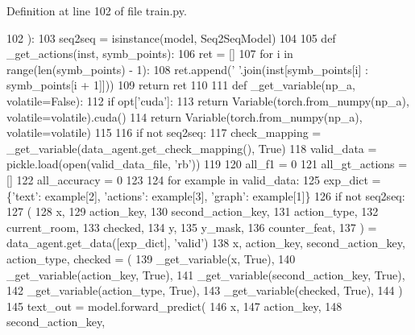 Definition at line 102 of file train.\+py.


\begin{DoxyCode}
102 ):
103     seq2seq = isinstance(model, Seq2SeqModel)
104 
105     \textcolor{keyword}{def }\_get\_actions(inst, symb\_points):
106         ret = []
107         \textcolor{keywordflow}{for} i \textcolor{keywordflow}{in} range(len(symb\_points) - 1):
108             ret.append(\textcolor{stringliteral}{' '}.join(inst[symb\_points[i] : symb\_points[i + 1]]))
109         \textcolor{keywordflow}{return} ret
110 
111     \textcolor{keyword}{def }\_get\_variable(np\_a, volatile=False):
112         \textcolor{keywordflow}{if} opt[\textcolor{stringliteral}{'cuda'}]:
113             \textcolor{keywordflow}{return} Variable(torch.from\_numpy(np\_a), volatile=volatile).cuda()
114         \textcolor{keywordflow}{return} Variable(torch.from\_numpy(np\_a), volatile=volatile)
115 
116     \textcolor{keywordflow}{if} \textcolor{keywordflow}{not} seq2seq:
117         check\_mapping = \_get\_variable(data\_agent.get\_check\_mapping(), \textcolor{keyword}{True})
118     valid\_data = pickle.load(open(valid\_data\_file, \textcolor{stringliteral}{'rb'}))
119 
120     all\_f1 = 0
121     all\_gt\_actions = []
122     all\_accuracy = 0
123 
124     \textcolor{keywordflow}{for} example \textcolor{keywordflow}{in} valid\_data:
125         exp\_dict = \{\textcolor{stringliteral}{'text'}: example[2], \textcolor{stringliteral}{'actions'}: example[3], \textcolor{stringliteral}{'graph'}: example[1]\}
126         \textcolor{keywordflow}{if} \textcolor{keywordflow}{not} seq2seq:
127             (
128                 x,
129                 action\_key,
130                 second\_action\_key,
131                 action\_type,
132                 current\_room,
133                 checked,
134                 y,
135                 y\_mask,
136                 counter\_feat,
137             ) = data\_agent.get\_data([exp\_dict], \textcolor{stringliteral}{'valid'})
138             x, action\_key, second\_action\_key, action\_type, checked = (
139                 \_get\_variable(x, \textcolor{keyword}{True}),
140                 \_get\_variable(action\_key, \textcolor{keyword}{True}),
141                 \_get\_variable(second\_action\_key, \textcolor{keyword}{True}),
142                 \_get\_variable(action\_type, \textcolor{keyword}{True}),
143                 \_get\_variable(checked, \textcolor{keyword}{True}),
144             )
145             text\_out = model.forward\_predict(
146                 x,
147                 action\_key,
148                 second\_action\_key,

\end{DoxyCode}
